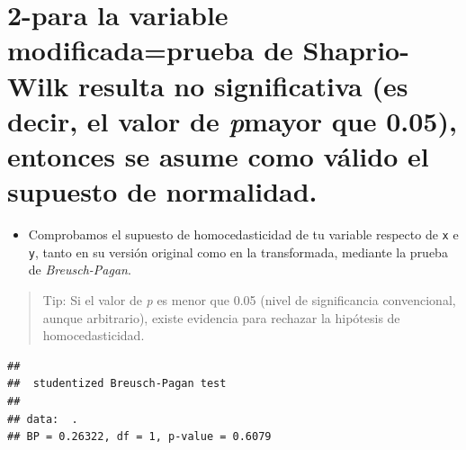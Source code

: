 \documentclass[11pt,]{article}
\newenvironment{Shaded}{\begin{snugshade}}{\end{snugshade}}
\newcommand{\KeywordTok}[1]{\textcolor[rgb]{0.13,0.29,0.53}{\textbf{#1}}}
\newcommand{\StringTok}[1]{\textcolor[rgb]{0.31,0.60,0.02}{#1}}
\newcommand{\OperatorTok}[1]{\textcolor[rgb]{0.81,0.36,0.00}{\textbf{#1}}}
\newcommand{\NormalTok}[1]{#1}
\providecommand{\tightlist}{%
\setlength{\itemsep}{0pt}\setlength{\parskip}{0pt}}
\begin{document}
\section{\texorpdfstring{2-para la variable modificada=prueba de
Shaprio-Wilk resulta no significativa (es decir, el valor de
\emph{p}mayor que 0.05), entonces se asume como válido el supuesto de
normalidad.}{2-para la variable modificada=prueba de Shaprio-Wilk resulta no significativa (es decir, el valor de pmayor que 0.05), entonces se asume como válido el supuesto de normalidad.}}\label{para-la-variable-modificadaprueba-de-shaprio-wilk-resulta-no-significativa-es-decir-el-valor-de-pmayor-que-0.05-entonces-se-asume-como-vuxe1lido-el-supuesto-de-normalidad.}

\begin{itemize}
\tightlist
\item
  Comprobamos el supuesto de homocedasticidad de tu variable respecto de
  \texttt{x} e \texttt{y}, tanto en su versión original como en la
  transformada, mediante la prueba de \emph{Breusch-Pagan}.
\end{itemize}

\begin{quote}
Tip: Si el valor de \emph{p} es menor que 0.05 (nivel de significancia
convencional, aunque arbitrario), existe evidencia para rechazar la
hipótesis de homocedasticidad.
\end{quote}

\begin{Shaded}
\end{Shaded}

\begin{verbatim}
## 
##  studentized Breusch-Pagan test
## 
## data:  .
## BP = 0.26322, df = 1, p-value = 0.6079
\end{verbatim}

\begin{Shaded}
\end{Shaded}
\end{document}
